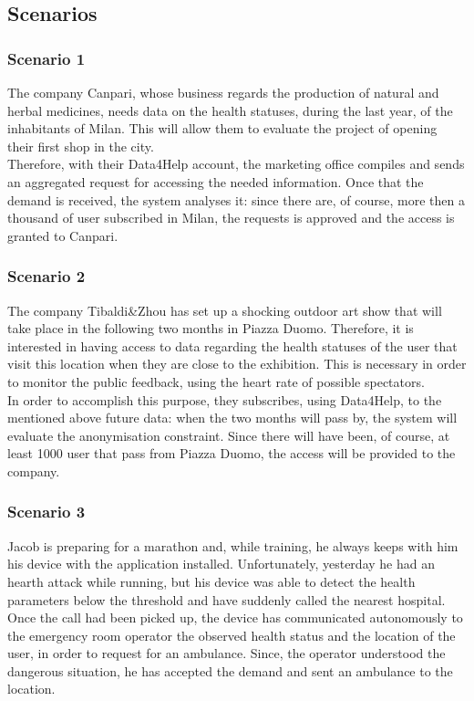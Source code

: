 \subsection{Scenarios}

\subsubsection{Scenario 1}
The company Canpari, whose business regards the production of natural and herbal medicines, needs data on the health statuses, during the last year, of the inhabitants of Milan. This will allow them to evaluate the project of opening their first shop in the city. \\
Therefore, with their Data4Help account, the marketing office compiles and sends an aggregated request for accessing the needed information. 
Once that the demand is received, the system analyses it: since there are, of course, more then a thousand of user subscribed in Milan, the requests is approved and the access is granted to Canpari. 

\subsubsection{Scenario 2}
The company Tibaldi\&Zhou has set up a shocking outdoor art show that will take place in the following two months in Piazza Duomo.
Therefore, it is interested in having access to data regarding the health statuses of the user that visit this location when they are close to the exhibition.
This is necessary in order to monitor the public feedback, using the heart rate of possible spectators. \\
In order to accomplish this purpose, they subscribes, using Data4Help, to the mentioned above future data: when the two months will pass by, the system will evaluate the anonymisation constraint. Since there will have been, of course, at least 1000 user that pass from Piazza Duomo, the access will be provided to the company. 

\subsubsection{Scenario 3}
Jacob is preparing for a marathon and, while training, he always keeps with him his device with the application installed. 
Unfortunately, yesterday he had an hearth attack while running, but his device was able to detect the health parameters below the threshold and have suddenly called the nearest hospital. \\
Once the call had been picked up, the device has communicated autonomously to the emergency room operator the observed health status and the location of the user, in order to request for an ambulance. 
Since, the operator understood the dangerous situation, he has accepted the demand and sent an ambulance to the location.

